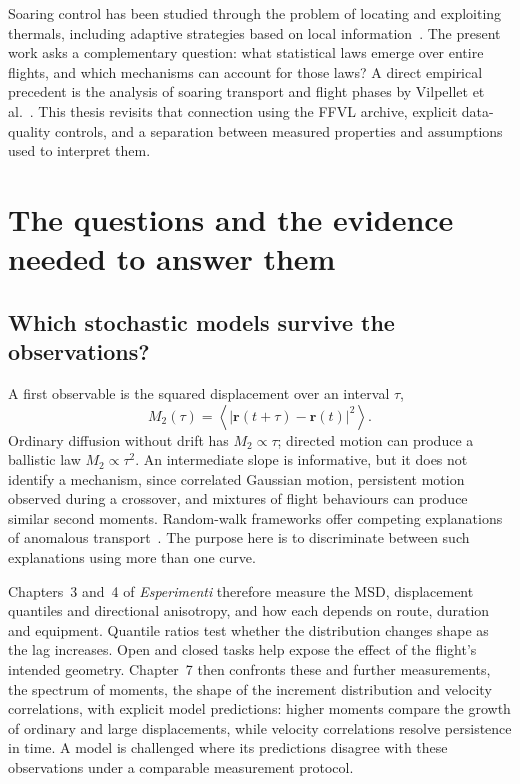 Soaring control has been studied through the problem of locating and exploiting thermals,
including adaptive strategies based on local information~\cite{reddy2016}. The present
work asks a complementary question: what statistical laws emerge over entire flights, and
which mechanisms can account for those laws? A direct empirical precedent is the analysis
of soaring transport and flight phases by Vilpellet et al.~\cite{vilpellet2026}. This
thesis revisits that connection using the FFVL archive, explicit data-quality controls,
and a separation between measured properties and assumptions used to interpret them.

\section{The questions and the evidence needed to answer them}

\subsection{Which stochastic models survive the observations?}

A first observable is the squared displacement over an interval $\tau$,
\begin{equation}
  M_2(\tau)=\left\langle\left|\mathbf r(t+\tau)-\mathbf r(t)\right|^2\right\rangle.
  \label{eq:intro-msd}
\end{equation}
Ordinary diffusion without drift has $M_2\propto\tau$; directed motion can produce a ballistic law
$M_2\propto\tau^2$. An intermediate slope is informative, but it does not identify a
mechanism, since correlated Gaussian motion, persistent motion observed during a crossover,
and mixtures of flight behaviours can produce similar second moments. Random-walk
frameworks offer competing explanations of anomalous transport~\cite{metzler2000}.
The purpose here is to discriminate between such explanations using more than one curve.

Chapters~3 and~4 of \emph{Esperimenti} therefore measure the MSD, displacement
quantiles and directional anisotropy, and how each depends on route, duration and
equipment.
Quantile ratios test whether the distribution changes shape as the lag increases. Open
and closed tasks help expose the effect of the flight's intended geometry. Chapter~7
then confronts these and further measurements, the spectrum of moments, the shape of the
increment distribution and velocity correlations, with explicit model predictions: higher
moments compare the growth of ordinary and large displacements, while velocity correlations
resolve persistence in time. A model is challenged where its predictions disagree with these
observations under a comparable measurement protocol.

